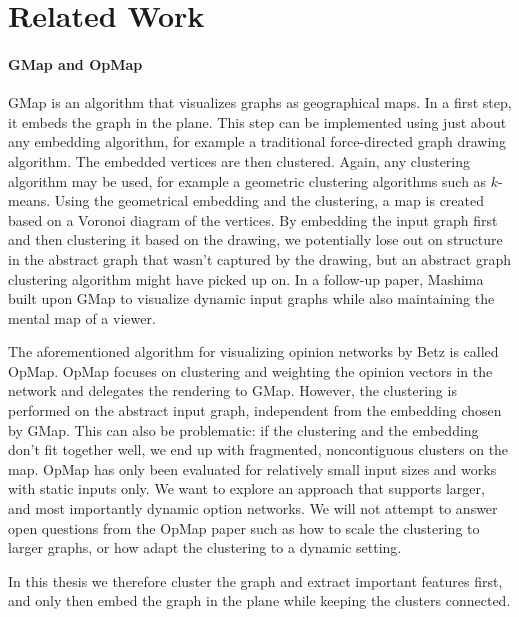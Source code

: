 \section{Related Work}
\label{sect:related-work}


\paragraph{GMap and OpMap}

GMap \cite{gansner2009gmap} is an algorithm that visualizes graphs as geographical maps.
In a first step, it embeds the graph in the plane.
This step can be implemented using just about any embedding algorithm, for example a traditional force-directed graph drawing algorithm.
The embedded vertices are then clustered.
Again, any clustering algorithm may be used, for example a geometric clustering algorithms such as $k$-means.
Using the geometrical embedding and the clustering, a map is created based on a Voronoi diagram of the vertices.
By embedding the input graph first and then clustering it based on the drawing, we potentially lose out on structure in the abstract graph that wasn't captured by the drawing, but an abstract graph clustering algorithm might have picked up on.
In a follow-up paper, Mashima \etal{} \cite{mashima2011visualizing} built upon GMap to visualize dynamic input graphs while also maintaining the mental map of a viewer.

The aforementioned algorithm for visualizing opinion networks by Betz \etal{} is called OpMap.
OpMap focuses on clustering and weighting the opinion vectors in the network and delegates the rendering to GMap.
However, the clustering is performed on the abstract input graph, independent from the embedding chosen by GMap.
This can also be problematic: if the clustering and the embedding don't fit together well, we end up with fragmented, noncontiguous clusters on the map.
OpMap has only been evaluated for relatively small input sizes and works with static inputs only.
We want to explore an approach that supports larger, and most importantly dynamic option networks.
We will not attempt to answer open questions from the OpMap paper such as how to scale the clustering to larger graphs, or how adapt the clustering to a dynamic setting.

In this thesis we therefore cluster the graph and extract important features first, and only then embed the graph in the plane while keeping the clusters connected.


